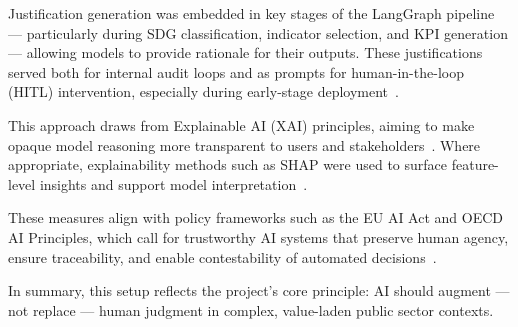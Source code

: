 Justification generation was embedded in key stages of the LangGraph pipeline — particularly during SDG classification, indicator selection, and KPI generation — allowing models to provide rationale for their outputs.
These justifications served both for internal audit loops and as prompts for human-in-the-loop (HITL) intervention, especially during early-stage deployment~\parencite{ribeiro2016should, Holzinger2016HITL}.

This approach draws from Explainable AI (XAI) principles, aiming to make opaque model reasoning more transparent to users and stakeholders~\parencite{dwivedi2023explainable}.
Where appropriate, explainability methods such as SHAP were used to surface feature-level insights and support model interpretation~\parencite{lundberg2017shap}.

These measures align with policy frameworks such as the EU AI Act and OECD AI Principles, which call for trustworthy AI systems that preserve human agency, ensure traceability, and enable contestability of automated decisions~\parencite{euai2023, oecd2022ai}.

In summary, this setup reflects the project's core principle: AI should augment — not replace — human judgment in complex, value-laden public sector contexts.